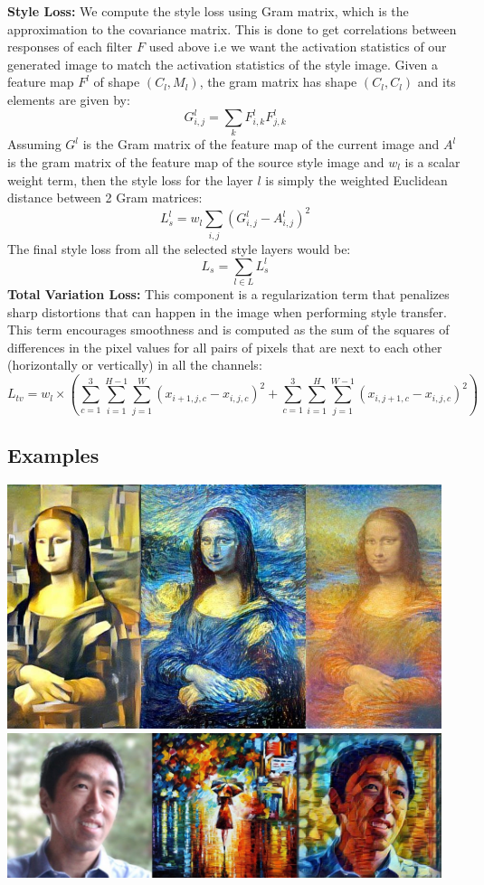 \documentclass{article}
\begin{document}
\textbf{Style Loss: } We compute the style loss using Gram matrix, which is the approximation to the covariance matrix.
This is done to get correlations between responses of each filter $F$ used above i.e we want the activation statistics
of our generated image to match the activation statistics of the style image. Given a feature map $F^l$ of shape
$(C_l, M_l)$, the gram matrix has shape $(C_l, C_l)$ and its elements are given by:\\
$$G_{i,j}^l = \sum_{k}F_{i,k}^l  F_{j,k}^l$$
Assuming $G^l$ is the Gram matrix of the feature map of the current image and $A^l$ is the gram matrix of the
feature map of the source style image and $w_l$ is a scalar weight term, then the style loss for the layer $l$
is simply the weighted Euclidean distance between 2 Gram matrices:\\
$$L_s^l = w_l \sum_{i,j} (G_{i,j}^l - A_{i,j}^l)^2$$
The final style loss from all the selected style layers would be:\\
$$L_s = \sum_{l \in L} L_s^l$$
\textbf{Total Variation Loss: } This component is a regularization term that penalizes sharp distortions that can
happen in the image when performing style transfer. This term encourages smoothness and is computed as the sum of the
squares of differences in the pixel values for all pairs of pixels that are next to each other (horizontally or vertically)
in all the channels:\\
$$L_{tv} = w_l \times \left( \sum_{c=1}^{3} \sum_{i=1}^{H-1} \sum_{j=1}^{W} (x_{i+1,j,c} - x_{i,j,c})^2 + \sum_{c=1}^{3} \sum_{i=1}^{H} \sum_{j=1}^{W-1} (x_{i,j+1,c} - x_{i,j,c})^2 \right)$$

\subsection{Examples}
\includegraphics[width=5in]{./imgs/st-1.png}\\
\includegraphics[width=5in]{./imgs/st-2.jpg}\\
\end{document}
